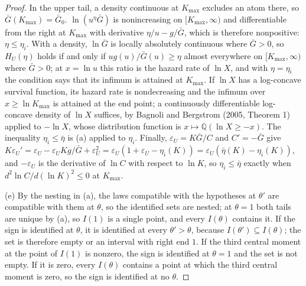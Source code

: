 \documentclass[11pt]{article}
\theoremstyle{remark}
\newcommand{\Q}{\mathbb{Q}}
\begin{document}
\begin{proof}
In the upper tail, a density continuous at $K_{\max}$ excludes an atom there, so $\bar G(K_{\max})=\bar G_0$. $\ln(u^\eta\bar G)$ is nonincreasing on $[K_{\max},\infty)$ and differentiable from the right at $K_{\max}$ with derivative $\eta/u-g/\bar G$, which is therefore nonpositive: $\eta\le\eta_i$. With a density, $\ln\bar G$ is locally absolutely continuous where $\bar G>0$, so $H_U(\eta)$ holds if and only if $ug(u)/\bar G(u)\ge\eta$ almost everywhere on $[K_{\max},\infty)$ where $\bar G>0$; at $x=\ln u$ this ratio is the hazard rate of $\ln X$, and with $\eta=\eta_i$ the condition says that its infimum is attained at $K_{\max}$. If $\ln X$ has a log-concave survival function, its hazard rate is nondecreasing and the infimum over $x\ge\ln K_{\max}$ is attained at the end point; a continuously differentiable log-concave density of $\ln X$ suffices, by Bagnoli and Bergstrom (2005, Theorem 1) applied to $-\ln X$, whose distribution function is $x\mapsto\Q(\ln X\ge-x)$. The inequality $\eta_i\le\bar\eta$ is (a) applied to $\eta_i$. Finally, $\varepsilon_U=K\bar G/C$ and $C'=-\bar G$ give $K\varepsilon_U'=\varepsilon_U-\varepsilon_UKg/\bar G+\varepsilon_U^2=\varepsilon_U(1+\varepsilon_U-\eta_i(K))=\varepsilon_U(\bar\eta(K)-\eta_i(K))$, and $-\varepsilon_U$ is the derivative of $\ln C$ with respect to $\ln K$, so $\eta_i\le\bar\eta$ exactly when $d^2\ln C/d(\ln K)^2\le0$ at $K_{\max}$.

(e) By the nesting in (a), the laws compatible with the hypotheses at $\theta'$ are compatible with them at $\theta$, so the identified sets are nested; at $\theta=1$ both tails are unique by (a), so $I(1)$ is a single point, and every $I(\theta)$ contains it. If the sign is identified at $\theta$, it is identified at every $\theta'>\theta$, because $I(\theta')\subseteq I(\theta)$; the set is therefore empty or an interval with right end $1$. If the third central moment at the point of $I(1)$ is nonzero, the sign is identified at $\theta=1$ and the set is not empty. If it is zero, every $I(\theta)$ contains a point at which the third central moment is zero, so the sign is identified at no $\theta$.
\end{proof}
\end{document}
